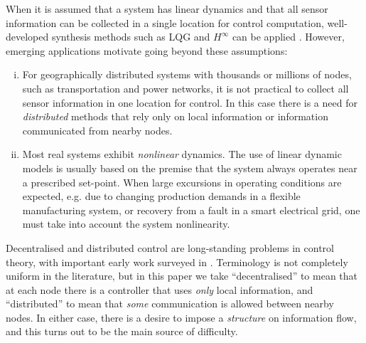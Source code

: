 \documentclass[10pt,twocolumn,twoside]{IEEEtran}
\newcounter{para}
\newcommand\mypara{\par}
\theoremstyle{plain}
\theoremstyle{definition}
\theoremstyle{remark}
\begin{document}
\mypara When it is assumed that a system  has linear dynamics and that all sensor information can be collected in a single location for control computation, well-developed synthesis methods such as LQG and $H^\infty$ can be applied \cite{anderson1990optimal, dullerud2000course}. However, emerging applications motivate going beyond these assumptions:
\begin{enumerate}[i)]
	\item For geographically distributed systems with thousands or millions of nodes, such as transportation and power networks, it is not practical to collect all sensor information in one location for control. In this case there is a need for {\em distributed} methods that rely only on local information or information communicated from nearby nodes.
 \item Most real systems exhibit {\em nonlinear} dynamics. The use of linear dynamic models is usually based on the premise that the system always operates near a prescribed set-point. When large excursions in operating conditions are expected, e.g. due to changing production demands in a flexible manufacturing system, or recovery from a fault in a smart electrical grid, one must take into account the system nonlinearity.
\end{enumerate} 



\mypara Decentralised and distributed control are long-standing problems in control theory, with important early work surveyed in \cite{sandell_survey_1978}. Terminology is not completely uniform in the literature, but
in this paper we take ``decentralised'' to mean that at each node there is a controller that uses {\em only} local information, and  ``distributed'' to mean that {\em some} communication is allowed between nearby nodes. In either case, there is a desire to impose a {\em structure} on information flow, and this turns out to be the main source of difficulty.
\end{document}
